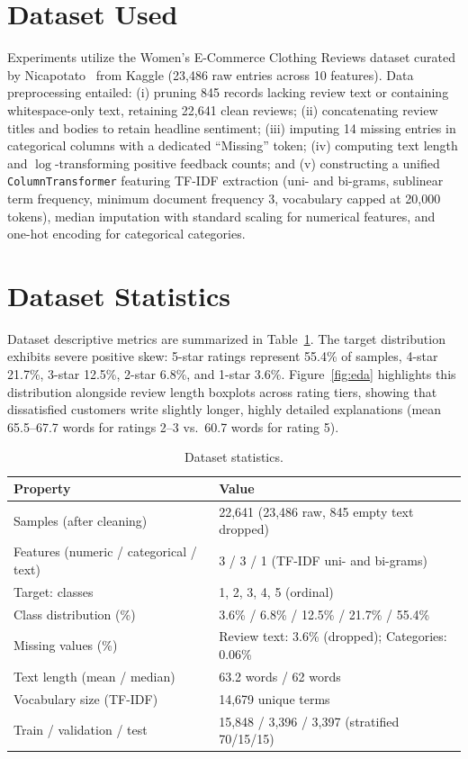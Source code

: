 \documentclass[conference,10pt,a4paper]{IEEEtran}
\begin{document}
\section{Dataset Used}
Experiments utilize the Women's E-Commerce Clothing Reviews dataset curated by Nicapotato~\cite{ds} from Kaggle (23,486 raw entries across 10 features). Data preprocessing entailed: (i) pruning 845 records lacking review text or containing whitespace-only text, retaining 22,641 clean reviews; (ii) concatenating review titles and bodies to retain headline sentiment; (iii) imputing 14 missing entries in categorical columns with a dedicated ``Missing'' token; (iv) computing text length and $\log$-transforming positive feedback counts; and (v) constructing a unified \texttt{ColumnTransformer} featuring TF-IDF extraction (uni- and bi-grams, sublinear term frequency, minimum document frequency 3, vocabulary capped at 20,000 tokens), median imputation with standard scaling for numerical features, and one-hot encoding for categorical categories.

\section{Dataset Statistics}
Dataset descriptive metrics are summarized in Table~\ref{tab:stats}. The target distribution exhibits severe positive skew: 5-star ratings represent 55.4\% of samples, 4-star 21.7\%, 3-star 12.5\%, 2-star 6.8\%, and 1-star 3.6\%. Figure~\ref{fig:eda} highlights this distribution alongside review length boxplots across rating tiers, showing that dissatisfied customers write slightly longer, highly detailed explanations (mean 65.5--67.7 words for ratings 2--3 vs.\ 60.7 words for rating 5).

\begin{table}[h]
\centering
\caption{Dataset statistics.}
\label{tab:stats}
\begin{tabular}{ll}
\toprule
Property & Value \\
\midrule
Samples (after cleaning) & 22,641 (23,486 raw, 845 empty text dropped) \\
Features (numeric / categorical / text) & 3 / 3 / 1 (TF-IDF uni- and bi-grams) \\
Target: classes & 1, 2, 3, 4, 5 (ordinal) \\
Class distribution (\%) & 3.6\% / 6.8\% / 12.5\% / 21.7\% / 55.4\% \\
Missing values (\%) & Review text: 3.6\% (dropped); Categories: 0.06\% \\
Text length (mean / median) & 63.2 words / 62 words \\
Vocabulary size (TF-IDF) & 14,679 unique terms \\
Train / validation / test & 15,848 / 3,396 / 3,397 (stratified 70/15/15) \\
\bottomrule
\end{tabular}
\end{table}
\end{document}
